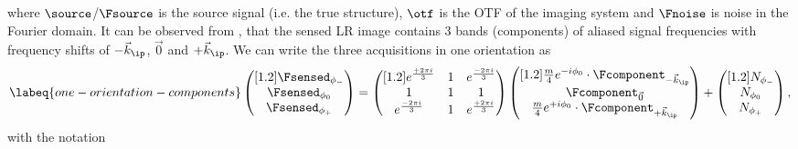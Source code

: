     where \(\source\)/\(\Fsource\) is the source signal (i.e. the true structure), \(\otf\) is the \ac{OTF} of the
    imaging system and \(\Fnoise\) is noise in the Fourier domain.
It can be observed from , that the sensed \ac{LR} image contains 3 bands (components) of 
    aliased signal frequencies with frequency shifts of \(-\vec{k}_\ip\), \(\vec{0}\) and \(+\vec{k}_\ip\).
We can write the three acquisitions in one orientation as
\begin{equation} \labeq{one-orientation-components}
    \begin{pmatrix}[1.2]
        \Fsensed_{\phi_{-}} \\ \Fsensed_{\phi_0} \\ \Fsensed_{\phi_{+}}
    \end{pmatrix} = 
    \begin{pmatrix}[1.2]
        e^{\frac{+2\pi i}{3}}             & 1 & e^{\frac{-2\pi i}{3}} \\
        1 & 1 &  1\\
        e^{\frac{-2\pi i}{3}}             & 1 & e^{\frac{+2\pi i}{3}} \\
    \end{pmatrix}
    \begin{pmatrix}[1.2]
        \frac{m}{4}  e^{-i\phi_0} \cdot \Fcomponent_{-\vec{k}_\ip} \\
        \Fcomponent_{\vec{0}} \\
       \frac{m}{4} e^{+i\phi_0} \cdot\Fcomponent_{+\vec{k}_\ip} \\
   \end{pmatrix}
    + \begin{pmatrix}[1.2]
        N_{\phi_{-}}\\
        N_{\phi_{0}}\\
        N_{\phi_{+}}\\
    \end{pmatrix},
\end{equation}
with the notation
